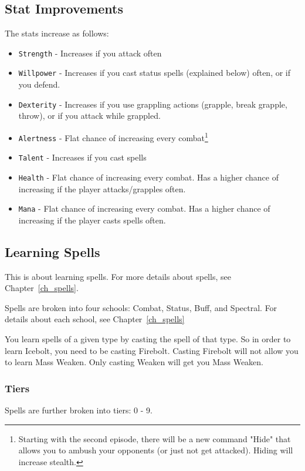 \documentclass{report}
\begin{document}
\subsection{Stat Improvements}
The stats increase as follows:
\begin{itemize}
    \item \verb|Strength| - Increases if you attack often
    \item \verb|Willpower| - Increases if you cast status spells (explained below) often, or if you defend.
    \item \verb|Dexterity| - Increases if you use grappling actions 
    (grapple, break grapple, throw), or if you attack while grappled.
    \item \verb|Alertness| - Flat chance of increasing every combat\footnote{
Starting with the second episode, there will be a new command "Hide" that allows you to ambush your opponents (or just not get attacked). Hiding will increase stealth.}
    \item \verb|Talent| - Increases if you cast spells
    \item \verb|Health| - Flat chance of increasing every combat. Has a higher
    chance of increasing if the player attacks/grapples often.
    \item \verb|Mana| - Flat chance of increasing every combat. Has a higher
    chance of increasing if the player casts spells often.
\end{itemize}


\subsection{Learning Spells}

This is about learning spells. For more details about spells, see Chapter~\ref{ch_spells}.

Spells are broken into four schools: Combat, Status, Buff, and Spectral. For 
details about each school, see Chapter~\ref{ch_spells}


You learn spells of a given type by casting the spell of that type. So in order to learn Icebolt, you need to be casting Firebolt.  Casting Firebolt will not allow you to learn Mass Weaken. Only casting Weaken will get you Mass Weaken.

\subsubsection{Tiers}
Spells are further broken into tiers: 0 - 9.
\end{document}
